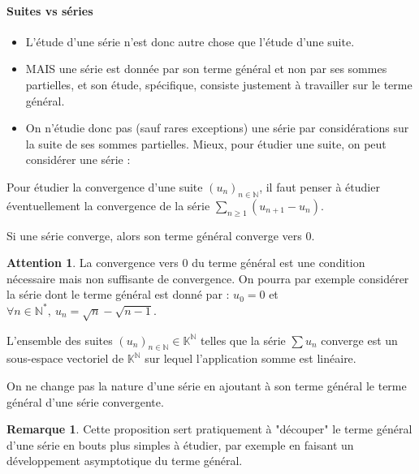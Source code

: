 \documentclass[french]{article}
\newcommand{\N}{\mathbb{N}}
\newcommand{\K}{\mathbb{K}}
\newcommand{\st}{^*}
\theoremstyle{plain}
\theoremstyle{definition}
\newtheorem*{rmq}{Remarque}
\newtheorem*{attention}{Attention}
\theoremstyle{remark}
\begin{document}
\paragraph{Suites vs séries}
\begin{itemize}
	\item L'étude d'une série n'est donc autre chose que l'étude d'une suite.
	\item MAIS une série est donnée par son terme général et non par ses sommes partielles, et son étude, spécifique, consiste justement à travailler sur le terme général.
	\item On n'étudie donc pas (sauf rares exceptions) une série par considérations sur la suite de ses sommes partielles. Mieux, pour étudier une suite, on peut considérer une série :
\end{itemize}

\begin{met}
	Pour étudier la convergence d'une suite $(u_n)_{n\in\N}$, il faut penser à étudier éventuellement la convergence de la série $\displaystyle\sum_{n\geqslant 1}(u_{n+1}-u_n)$.
\end{met}

\begin{prop}%
	Si une série converge, alors son terme général converge vers $0$.
\end{prop}

\begin{attention}
	La convergence vers $0$ du terme général est une condition nécessaire mais non suffisante de convergence. On pourra par exemple considérer la série dont le terme général est donné par : $u_0=0$ et $\forall n\in\N\st,\ u_n=\sqrt{n}-\sqrt{n-1}$.
\end{attention}

\begin{prop}%
	L'ensemble des suites $(u_n)_{n\in\N}\in\K^\N$ telles que la série $\displaystyle\sum u_n$ converge est un sous-espace vectoriel de $\K^\N$ sur lequel l'application somme est linéaire.
\end{prop}

\begin{cor}%
	On ne change pas la nature d'une série en ajoutant à son terme général le terme général d'une série convergente.
\end{cor}

\begin{rmq}
	Cette proposition sert pratiquement à "découper" le terme général d'une série en bouts plus simples à étudier, par exemple en faisant un développement asymptotique du terme général.
\end{rmq}
\end{document}

